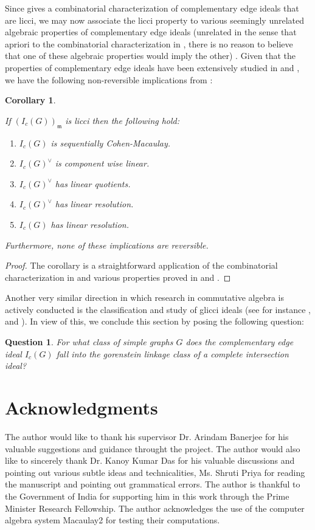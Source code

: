 \documentclass[oneside, 12pt]{amsart} \topmargin      -10mm \textwidth      160 true mm
\newtheorem{ques}[theorem]{Question}
\newtheorem{cor}[theorem]{Corollary}
\theoremstyle{definition}
\numberwithin{equation}{section}
\begin{document}
Since  gives a combinatorial characterization of complementary edge ideals that are licci, we may now associate the licci property to various seemingly unrelated algebraic properties of complementary edge ideals (unrelated in the sense that apriori to the combinatorial characterization in , there is no reason to believe that one of these algebraic properties would imply the other) . Given that the properties of complementary edge ideals have been extensively studied in \cite{ficarra2025complementary} and \cite{hibi2025complementary}, we have the following non-reversible implications from :
\begin{cor}\label{remark about other properties}


\noindent If $(I_c(G))_{\mathfrak{m}}$ is licci then the following hold:
\begin{enumerate}
    \item $I_c(G)$ is sequentially Cohen-Macaulay. 
    \item  $I_c(G)^{\vee}$ is component wise linear.
    \item  $I_c(G)^{\vee}$ has linear quotients.
    \item $I_c(G)^{\vee}$ has linear resolution.
    \item  $I_c(G)$ has linear resolution.
\end{enumerate}
Furthermore, none of these implications are reversible. 
\end{cor}
\begin{proof}
    The corollary is a straightforward application of the combinatorial characterization in  and various properties proved in \cite[Theorem~2.5.]{ficarra2025complementary} and \cite[Theorem~2.2.]{hibi2025complementary}.
\end{proof}
\noindent Another very similar direction in which research in commutative algebra is actively conducted is the classification and study of glicci ideals (see for instance \cite{migliore2002monomial}, \cite{migliore2013glicci} and \cite{nagel2008glicci}). In view of this, we conclude this section by posing the following question:
\begin{ques}
For what class of simple graphs $G$ does the complementary edge ideal $I_c(G)$ fall into the gorenstein linkage class of a complete intersection ideal? 
\end{ques}
\section*{Acknowledgments}
The author would like to thank his supervisor Dr. Arindam Banerjee for his valuable suggestions and guidance throught the project. 
The author would also like to sincerely thank Dr. Kanoy Kumar Das for his valuable discussions and pointing out various subtle ideas and technicalities, Ms. Shruti Priya for reading the manuscript and pointing out grammatical errors. The author is thankful to the Government of India for supporting him in this work through the Prime Minister Research Fellowship. The author acknowledges the use of the computer algebra system Macaulay2 \cite{M2} for testing their computations.
\end{document}
